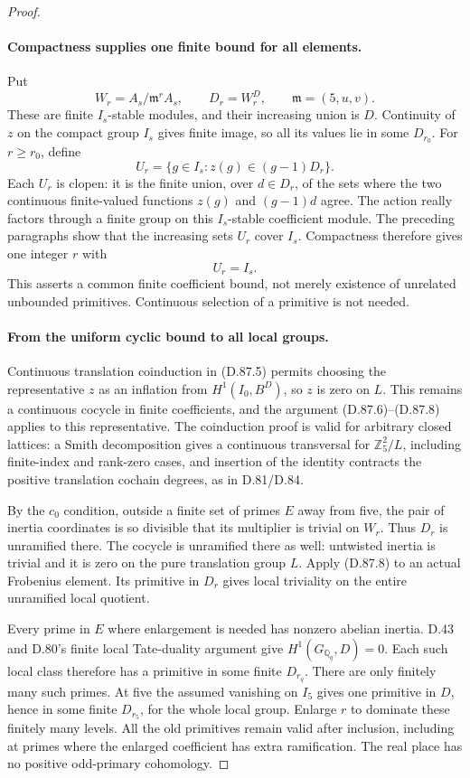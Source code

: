 \begin{proof}
\paragraph{Compactness supplies one finite bound for all elements.}
Put
\[
       W_r=A_s/\mathfrak m^r A_s,\qquad
       D_r=W_r^D,\qquad \mathfrak m=(5,u,v).
\]
These are finite \(I_s\)-stable modules, and their increasing
union is \(D\). Continuity of \(z\) on the compact group
\(I_s\) gives finite image, so all its values lie in some
\(D_{r_0}\). For \(r\ge r_0\), define
\[
 U_r=\{g\in I_s:z(g)\in(g-1)D_r\}.                    \tag{D.87.7}
\]
Each \(U_r\) is clopen: it is the finite union, over
\(d\in D_r\), of the sets where the two continuous
finite-valued functions \(z(g)\) and \((g-1)d\) agree.
The action really factors through a finite group on this
\(I_s\)-stable coefficient module. The preceding paragraphs
show that the increasing sets \(U_r\) cover \(I_s\).
Compactness therefore gives one integer \(r\) with
\[
                              U_r=I_s.                 \tag{D.87.8}
\]
This asserts a common finite coefficient bound, not merely
existence of unrelated unbounded primitives. Continuous
selection of a primitive is not needed.

\paragraph{From the uniform cyclic bound to all local groups.}
Continuous translation coinduction in (D.87.5) permits choosing
the representative \(z\) as an inflation from
\(H^1(I_0,B^D)\), so \(z\) is zero on \(L\).
This remains a continuous cocycle in finite coefficients,
and the argument (D.87.6)--(D.87.8) applies to this representative.
The coinduction proof is valid for arbitrary closed lattices:
a Smith decomposition gives a continuous transversal for
\(\mathbb Z_5^2/L\), including finite-index and rank-zero
cases, and insertion of the identity contracts the positive
translation cochain degrees, as in D.81/D.84.

By the \(c_0\) condition, outside a finite set of primes
\(E\) away from five, the pair of inertia coordinates is
so divisible that its multiplier is trivial on \(W_r\).
Thus \(D_r\) is unramified there. The cocycle is unramified
there as well: untwisted inertia is trivial and it is zero
on the pure translation group \(L\). Apply (D.87.8) to an
actual Frobenius element. Its primitive in \(D_r\) gives
local triviality on the entire unramified local quotient.

Every prime in \(E\) where enlargement is needed has nonzero
abelian inertia. D.43 and D.80's finite local Tate-duality
argument give \(H^1(G_{\mathbb Q_q},D)=0\). Each such local
class therefore has a primitive in some finite \(D_{r_q}\).
There are only finitely many such primes. At five the assumed
vanishing on \(I_5\) gives one primitive in \(D\), hence in
some finite \(D_{r_5}\), for the whole local group. Enlarge
\(r\) to dominate these finitely many levels. All the old
primitives remain valid after inclusion, including at primes
where the enlarged coefficient has extra ramification.
The real place has no positive odd-primary cohomology.


\end{proof}

